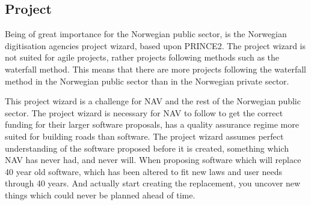 




\subsection{Project}
Being of great importance for the Norwegian public sector, is the Norwegian digitisation agencies project wizard, based upon PRINCE2. The project wizard is not suited for agile projects, rather projects following methods such as the waterfall method. This means that there are more projects following the waterfall method in the Norwegian public sector than in the Norwegian private sector. 

This project wizard is a challenge for NAV and the rest of the Norwegian public sector. The project wizard is necessary for NAV to follow to get the correct funding for their larger software proposals, has a quality assurance regime more suited for building roads than software. The project wizard assumes perfect understanding of the software proposed before it is created, something which NAV has never had, and never will. When proposing software which will replace 40 year old software, which has been altered to fit new laws and user needs through 40 years. And actually start creating the replacement, you uncover new things which could never be planned ahead of time.

